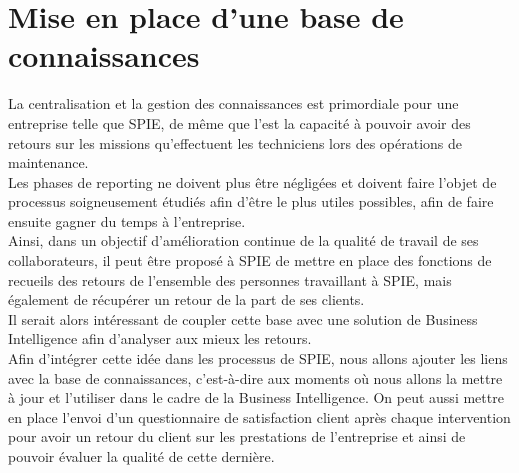 \section{Mise en place d’une base de connaissances}

La centralisation et la gestion des connaissances est primordiale pour une entreprise telle que SPIE, de même que l’est la capacité à pouvoir avoir des retours sur les missions qu’effectuent les techniciens lors des opérations de maintenance. \\

Les phases de reporting ne doivent plus être négligées et doivent faire l’objet de processus soigneusement étudiés afin d’être le plus utiles possibles, afin de faire ensuite gagner du temps à l’entreprise. \\

Ainsi, dans un objectif d’amélioration continue de la qualité de travail de ses collaborateurs, il peut être proposé à SPIE de mettre en place des fonctions de recueils des retours de l’ensemble des personnes travaillant à SPIE, mais également de récupérer un retour de la part de ses clients. \\

Il serait alors intéressant de coupler cette base avec une solution de Business Intelligence afin d’analyser aux mieux les retours. \\

Afin d’intégrer cette idée dans les processus de SPIE, nous allons ajouter les liens avec la base de connaissances, c’est-à-dire aux moments où nous allons la mettre à jour et l’utiliser dans le cadre de la Business Intelligence. On peut aussi mettre en place l’envoi d’un questionnaire de satisfaction client après chaque intervention pour avoir un retour du client sur les prestations de l’entreprise et ainsi de pouvoir évaluer la qualité de cette dernière.
